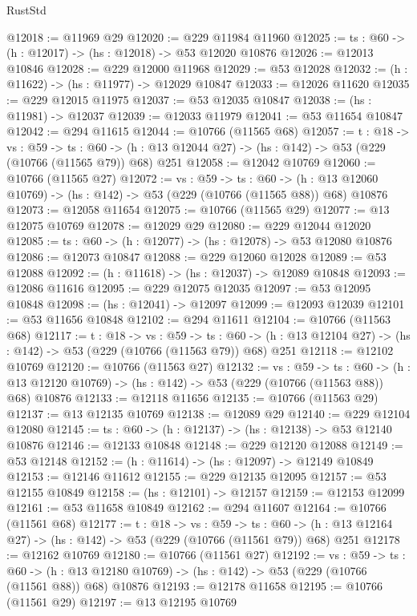 \begin{lexlean}{RustStd}
\begin{coremodule}
@12018 := @11969 @29
@12020 := @229 @11984 @11960
@12025 := {ts : @60} -> (h : @12017) -> (hs : @12018) -> @53 @12020 @10876
@12026 := @12013 @10846
@12028 := @229 @12000 @11968
@12029 := @53 @12028
@12032 := (h : @11622) -> (hs : @11977) -> @12029 @10847
@12033 := @12026 @11620
@12035 := @229 @12015 @11975
@12037 := @53 @12035 @10847
@12038 := (hs : @11981) -> @12037
@12039 := @12033 @11979
@12041 := @53 @11654 @10847
@12042 := @294 @11615
@12044 := @10766 (@11565 @68)
@12057 := {t : @18} ->
  {vs : @59} ->
  {ts : @60} -> (h : @13 @12044 @27) -> (hs : @142) -> @53 (@229 (@10766 (@11565 @79)) @68) @251
@12058 := @12042 @10769
@12060 := @10766 (@11565 @27)
@12072 := {vs : @59} ->
  {ts : @60} ->
  (h : @13 @12060 @10769) -> (hs : @142) -> @53 (@229 (@10766 (@11565 @88)) @68) @10876
@12073 := @12058 @11654
@12075 := @10766 (@11565 @29)
@12077 := @13 @12075 @10769
@12078 := @12029 @29
@12080 := @229 @12044 @12020
@12085 := {ts : @60} -> (h : @12077) -> (hs : @12078) -> @53 @12080 @10876
@12086 := @12073 @10847
@12088 := @229 @12060 @12028
@12089 := @53 @12088
@12092 := (h : @11618) -> (hs : @12037) -> @12089 @10848
@12093 := @12086 @11616
@12095 := @229 @12075 @12035
@12097 := @53 @12095 @10848
@12098 := (hs : @12041) -> @12097
@12099 := @12093 @12039
@12101 := @53 @11656 @10848
@12102 := @294 @11611
@12104 := @10766 (@11563 @68)
@12117 := {t : @18} ->
  {vs : @59} ->
  {ts : @60} -> (h : @13 @12104 @27) -> (hs : @142) -> @53 (@229 (@10766 (@11563 @79)) @68) @251
@12118 := @12102 @10769
@12120 := @10766 (@11563 @27)
@12132 := {vs : @59} ->
  {ts : @60} ->
  (h : @13 @12120 @10769) -> (hs : @142) -> @53 (@229 (@10766 (@11563 @88)) @68) @10876
@12133 := @12118 @11656
@12135 := @10766 (@11563 @29)
@12137 := @13 @12135 @10769
@12138 := @12089 @29
@12140 := @229 @12104 @12080
@12145 := {ts : @60} -> (h : @12137) -> (hs : @12138) -> @53 @12140 @10876
@12146 := @12133 @10848
@12148 := @229 @12120 @12088
@12149 := @53 @12148
@12152 := (h : @11614) -> (hs : @12097) -> @12149 @10849
@12153 := @12146 @11612
@12155 := @229 @12135 @12095
@12157 := @53 @12155 @10849
@12158 := (hs : @12101) -> @12157
@12159 := @12153 @12099
@12161 := @53 @11658 @10849
@12162 := @294 @11607
@12164 := @10766 (@11561 @68)
@12177 := {t : @18} ->
  {vs : @59} ->
  {ts : @60} -> (h : @13 @12164 @27) -> (hs : @142) -> @53 (@229 (@10766 (@11561 @79)) @68) @251
@12178 := @12162 @10769
@12180 := @10766 (@11561 @27)
@12192 := {vs : @59} ->
  {ts : @60} ->
  (h : @13 @12180 @10769) -> (hs : @142) -> @53 (@229 (@10766 (@11561 @88)) @68) @10876
@12193 := @12178 @11658
@12195 := @10766 (@11561 @29)
@12197 := @13 @12195 @10769

\end{coremodule}
\end{lexlean}
